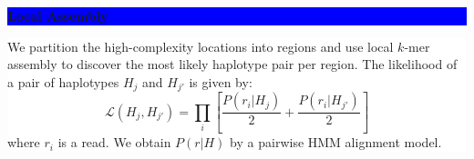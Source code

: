 \documentclass[11pt]{a0poster}
\begin{document}
{\begin{minipage}[t][2045pt][t]{\linewidth}
\begin{minipage}{0.6\linewidth}
\vspace{75pt}
\colorbox{Blue}{
\begin{minipage}[t]{\linewidth}
\vspace{30pt}
\begin{center}
\Huge \bf \color{White} Local Assembly
\end{center}
\vspace{17pt}
\end{minipage}
}
\colorbox{White}{
\begin{minipage}[t][400pt][t]{1.0\linewidth}
\vspace{20pt}
\color{Blue}
\LARGE We partition the high-complexity locations into regions and use local
$k$-mer assembly to discover the most likely haplotype pair per region.
The likelihood of a pair of haplotypes $H_j$ and $H_{j'}$ is given by:
\large $$ \mathcal{L}(H_j,H_{j'})=\prod_i\left[ \frac{P(r_i|H_j)}{2}+\frac{P(r_i|H_{j'})}{2} \right] $$
\LARGE where $r_i$ is a read.
We obtain $P(r|H)$ by a pairwise HMM alignment model.

\small \hfill

\pagebreak
\end{minipage}
}


\end{minipage}
\end{minipage}}
\end{document}
